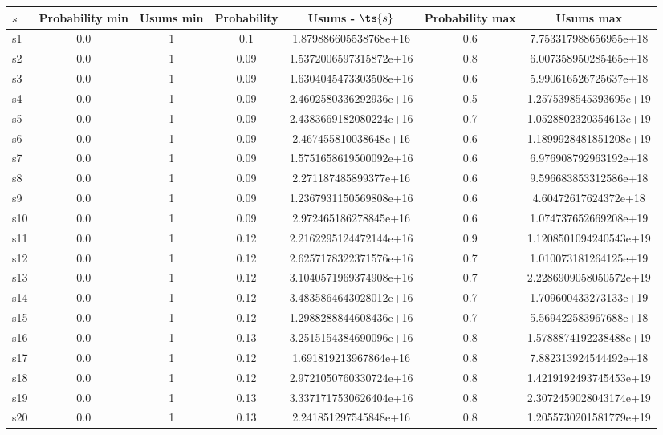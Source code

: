 \documentclass{article}
\begin{document}
\noindent\begin{tabular}{|l|c|c|c|c|c|c|}
\hline
$s$& Probability min & Usums min & Probability & Usums - $\ts{s}$ & Probability max & Usums max\\
\hline
s1 &0.0 & 1 & 0.1 & 1.879886605538768e+16 & 0.6 & 7.753317988656955e+18\\
\hline
s2 &0.0 & 1 & 0.09 & 1.5372006597315872e+16 & 0.8 & 6.007358950285465e+18\\
\hline
s3 &0.0 & 1 & 0.09 & 1.6304045473303508e+16 & 0.6 & 5.990616526725637e+18\\
\hline
s4 &0.0 & 1 & 0.09 & 2.4602580336292936e+16 & 0.5 & 1.2575398545393695e+19\\
\hline
s5 &0.0 & 1 & 0.09 & 2.4383669182080224e+16 & 0.7 & 1.0528802320354613e+19\\
\hline
s6 &0.0 & 1 & 0.09 & 2.467455810038648e+16 & 0.6 & 1.1899928481851208e+19\\
\hline
s7 &0.0 & 1 & 0.09 & 1.5751658619500092e+16 & 0.6 & 6.976908792963192e+18\\
\hline
s8 &0.0 & 1 & 0.09 & 2.271187485899377e+16 & 0.6 & 9.596683853312586e+18\\
\hline
s9 &0.0 & 1 & 0.09 & 1.2367931150569808e+16 & 0.6 & 4.60472617624372e+18\\
\hline
s10 &0.0 & 1 & 0.09 & 2.972465186278845e+16 & 0.6 & 1.074737652669208e+19\\
\hline
s11 &0.0 & 1 & 0.12 & 2.2162295124472144e+16 & 0.9 & 1.1208501094240543e+19\\
\hline
s12 &0.0 & 1 & 0.12 & 2.6257178322371576e+16 & 0.7 & 1.010073181264125e+19\\
\hline
s13 &0.0 & 1 & 0.12 & 3.1040571969374908e+16 & 0.7 & 2.2286909058050572e+19\\
\hline
s14 &0.0 & 1 & 0.12 & 3.4835864643028012e+16 & 0.7 & 1.709600433273133e+19\\
\hline
s15 &0.0 & 1 & 0.12 & 1.2988288844608436e+16 & 0.7 & 5.569422583967688e+18\\
\hline
s16 &0.0 & 1 & 0.13 & 3.2515154384690096e+16 & 0.8 & 1.5788874192238488e+19\\
\hline
s17 &0.0 & 1 & 0.12 & 1.691819213967864e+16 & 0.8 & 7.882313924544492e+18\\
\hline
s18 &0.0 & 1 & 0.12 & 2.9721050760330724e+16 & 0.8 & 1.4219192493745453e+19\\
\hline
s19 &0.0 & 1 & 0.13 & 3.3371717530626404e+16 & 0.8 & 2.3072459028043174e+19\\
\hline
s20 &0.0 & 1 & 0.13 & 2.241851297545848e+16 & 0.8 & 1.2055730201581779e+19\\

\end{tabular}
\end{document}
